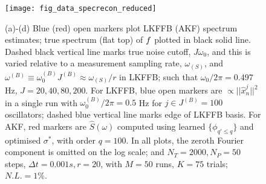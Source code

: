 \begin{figure}[tp]
    \texttt{[image: fig\_data\_specrecon\_reduced]}
     \caption{\label{fig:main:fig_data_specrecon} (a)-(d) Blue (red) open markers plot LKFFB (AKF) spectrum estimates; true spectrum (flat top) of $f$ plotted in black solid line. Dashed black vertical line marks true noise cutoff, $J\omega_0$, and this is varied relative to a measurement sampling rate, $\omega_{(S)}$, and $\omega^{(B)}\equiv \omega_0^{(B)} J^{(B)} \approx \omega_{(S)}/r $ in LKFFB; such that $\omega_0 / 2\pi = 0.497$ Hz, $J = 20, 40, 80, 200$. For LKFFB, blue open markers are $\propto ||\hat{x}^j_n||^2 $ in a single run with $\omega_0^{(B)} / 2\pi = 0.5$ Hz for $j \in J^{(B)} = 100$ oscillators; dashed blue vertical line marks edge of LKFFB basis. For AKF,  red markers are $\hat{S}(\omega)$ computed using learned $\{\phi_{q' \leq q}\}$ and optimised $\sigma^*$, with order $q = 100$.  In all plots, the zeroth Fourier component is omitted on the log scale; and $N_T = 2000, N_P = 50$ steps, $\Delta t = 0.001s, r=20$, with $M=50$ runs, $K=75$ trials; $N.L. = 1\%$.} 
\end{figure} 

